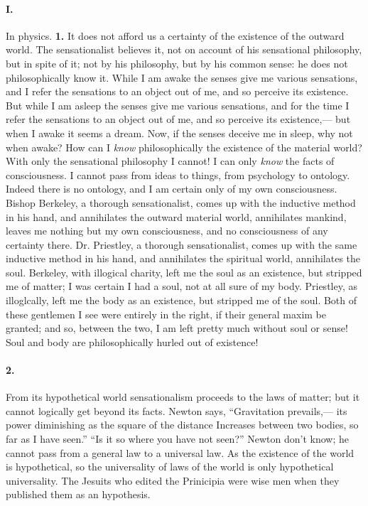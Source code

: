 \documentclass[12pt]{article}
\begin{document}
\paragraph{I.} In physics. \textbf{1.} It does not afford us a certainty of the existence of the outward world. The sensationalist believes it, not on account of his sensational philosophy, but in spite of it; not by his philosophy, but by his common sense: he does not philosophically know it. While I am awake the senses give me various sensations, and I refer the sensations to an object out of me, and so perceive its existence. But while I am asleep the senses give me various sensations, and for the time I refer the sensations to an object out of me, and so perceive its existence,--- but when I awake it seems a dream. Now, if the senses deceive me in sleep, why not when awake? How can I \emph{know} philosophically the existence of the material world? With only the sensational philosophy I cannot! I can only \emph{know} the facts of consciousness. I cannot pass from ideas to things, from psychology to ontology. Indeed there is no ontology, and I am certain only of my own consciousness. Bishop Berkeley, a thorough sensationalist, comes up with the inductive method in his hand, and annihilates the outward material world, annihilates mankind, leaves me nothing but my own consciousness, and no consciousness of any certainty there. Dr. Priestley, a thorough sensationalist, comes up with the same inductive method in his hand, and annihilates the spiritual world, annihilates the soul. Berkeley, with illogical charity, left me the soul as an existence, but stripped me of matter; I was certain I had a soul, not at all sure of my body. Priestley, as illoglcally, left me the body as an existence, but stripped me of the soul. Both of these gentlemen I see were entirely in the right, if their general maxim be granted; and so, between the two, I am left pretty much without soul or sense! Soul and body are philosophically hurled out of existence! 

\paragraph{2.} From its hypothetical world sensationalism proceeds to the laws of matter; but it cannot logically get beyond its facts. Newton says, ``Gravitation prevails,--- its power diminishing as the square of the distance Increases between two bodies, so far as I have seen.'' ``Is it so where you have not seen?'' Newton don't know; he cannot pass from a general law to a universal law. As the existence of the world is hypothetical, so the universality of laws of the world is only hypothetical universality. The Jesuits who edited the Prinicipia were wise men when they published them as an hypothesis.
\end{document}
